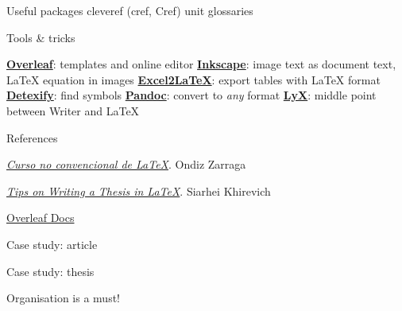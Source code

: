 \begin{frame}{Useful packages}
cleveref (cref, Cref)
unit
glossaries
\end{frame}

\begin{frame}{Tools \& tricks}
 \begin{fullpageitemize}
  \itemR \href{https://www.overleaf.com/}{\textbf{Overleaf}}: templates and online editor
  \itemR \href{http://wiki.inkscape.org/wiki/index.php/LaTeX}{\textbf{Inkscape}}: image text as document text, LaTeX equation in images
  \itemR \href{https://www.ctan.org/tex-archive/support/excel2latex/}{\textbf{Excel2LaTeX}}: export tables with LaTeX format
  \itemR \href{http://detexify.kirelabs.org/classify.html}{\textbf{Detexify}}: find symbols
  \itemR \href{http://pandoc.org/}{\textbf{Pandoc}}: convert to \emph{any} format
  \itemR \href{https://www.lyx.org/}{\textbf{LyX}}: middle point between Writer and LaTeX
\end{fullpageitemize}
 
\end{frame}

\begin{frame}{References}
 \begin{fullpageitemize}
	\itemR\href{https://ondiz.github.io/cursoLatex/}{\emph{Curso no convencional de LaTeX}}. Ondiz Zarraga

	\itemR \href{http://www.khirevich.com/latex/}{\emph{Tips on Writing a Thesis in LaTeX}}. Siarhei Khirevich
	
	\itemR \href{https://www.overleaf.com/learn/latex/Main_Page}{Overleaf Docs}
 \end{fullpageitemize}
 
\end{frame}

\begin{frame}{Case study: article}
 
 \begin{fullpageitemize}
	\itemR
 \end{fullpageitemize} 
 
 \note{}
\end{frame}

\begin{frame}{Case study: thesis}
 
 \begin{fullpageitemize}
	\itemR Organisation is a must!
 \end{fullpageitemize} 
 \note{}
\end{frame}


